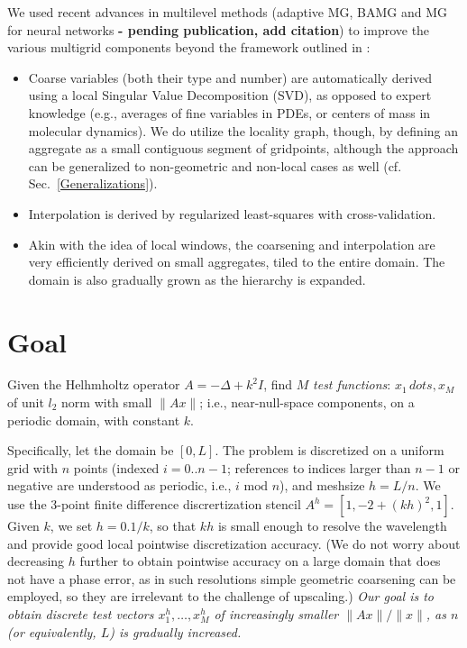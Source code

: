 \documentclass{article}
\begin{document}
We used recent advances in multilevel methods (adaptive MG, BAMG \cite{bamg, lamg, mg_guide} and MG for neural networks \textbf{- pending publication, add citation}) to improve the various multigrid components beyond the framework outlined in \cite{su}:
\begin{itemize}
	\item Coarse variables (both their type and number) are automatically derived using a local Singular Value Decomposition (SVD), as opposed to expert knowledge (e.g., averages of fine variables in PDEs, or centers of mass in molecular dynamics). We do utilize the locality graph, though, by defining an aggregate as a small contiguous segment of gridpoints, although the approach can be generalized to non-geometric and non-local cases as well (cf. Sec.~\ref{Generalizations}).
	\item Interpolation is derived by regularized least-squares with cross-validation.
	\item Akin with the idea of local windows, the coarsening and interpolation are very efficiently derived on small aggregates, tiled to the entire domain. The domain is also gradually grown as the hierarchy is expanded.
\end{itemize}

\section{Goal}
Given the Helhmholtz operator $A = -\Delta + k^2 I$, find $M$ \emph{test functions}: $x_1\,dots,x_M$ of unit $l_2$ norm with small $\|A x\|$; i.e., near-null-space components, on a periodic domain, with constant $k$. 

Specifically, let the domain be $[0,L]$. The problem is discretized on a uniform grid with $n$ points (indexed $i = 0..n-1$; references to indices larger than $n - 1$ or negative are understood as periodic, i.e., $i \text{ mod } n$), and meshsize $h = L/n$. We use the 3-point finite difference discrertization stencil $A^h = [1, -2 + (kh)^2, 1]$. Given $k$, we set $h = 0.1/k$, so that $kh$ is small enough to resolve the wavelength and provide good local pointwise discretization accuracy. (We do not worry about decreasing $h$ further to obtain pointwise accuracy on a large domain that does not have a phase error, as in such resolutions simple geometric coarsening can be employed, so they are irrelevant to the challenge of upscaling.) \emph{Our goal is to obtain discrete test vectors $x^h_1,\dots,x^h_M$ of increasingly smaller $\|A x\|/\|x\|$, as $n$ (or equivalently, $L$) is gradually increased.}
\end{document}
